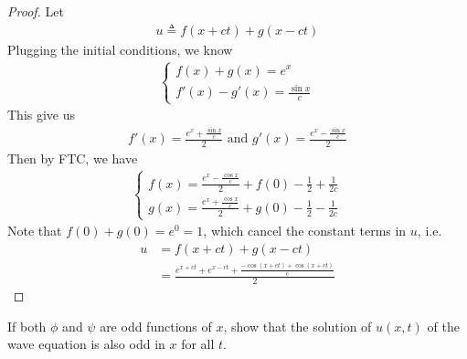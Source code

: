 \documentclass{report}
\begin{document}
\begin{proof}
Let 
\begin{align*}
u\triangleq f(x+ct)+g(x-ct)
\end{align*}
Plugging the initial conditions, we know 
\begin{align*}
\begin{cases}
 f(x)+g(x)=e^x \\
 f'(x)-g'(x)= \frac{\sin x}{c} 
\end{cases}
\end{align*}
This give us 
\begin{align*}
f'(x)= \frac{e^x+ \frac{\sin x}{c}}{2}\text{ and }g'(x)= \frac{e^x - \frac{\sin x}{c}}{2}
\end{align*}
Then by FTC, we have
\begin{align*}
\begin{cases}
  f(x)= \frac{e^x-\frac{\cos x}{c}}{2}+f(0)- \frac{1}{2} +\frac{1}{2c} \\
  g(x)= \frac{e^x + \frac{\cos x}{c}}{2} +g(0) - \frac{1}{2}- \frac{1}{2c}
\end{cases}
\end{align*}
Note that $f(0)+g(0)=e^0=1$, which cancel the constant terms in $u$, i.e.
\begin{align*}
u&=f(x+ct)+g(x-ct)\\
&=\frac{e^{x+ct}+ e^{x-ct} + \frac{-\cos (x+ct)+ \cos (x+ct)}{c}}{2}
\end{align*}
\end{proof}
\begin{question}{}{}
If both $\phi$ and $\psi$ are odd functions of $x$, show that the solution of  $u(x,t)$ of the wave equation is also odd in $x$ for all $t$. 
\end{question}
\end{document}
